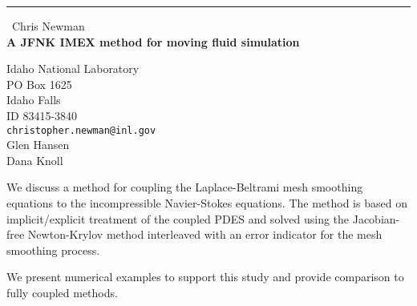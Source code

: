 \documentclass{report}
\begin{document}
\begin{center}
\rule{6in}{1pt} \
{\large Chris Newman \\
{\bf A JFNK IMEX method for moving fluid simulation}}

Idaho National Laboratory \\ PO Box 1625 \\ Idaho Falls \\ ID 83415-3840
\\
{\tt christopher.newman@inl.gov}\\
Glen Hansen\\
Dana Knoll\end{center}

We discuss a method for coupling the Laplace-Beltrami mesh smoothing equations
to the incompressible Navier-Stokes equations.
The method is based on implicit/explicit treatment of the coupled PDES and
solved using the Jacobian-free Newton-Krylov method interleaved
with an error indicator for the mesh smoothing process.

We present numerical examples to support this study and provide comparison to
fully coupled methods.
\end{document}
